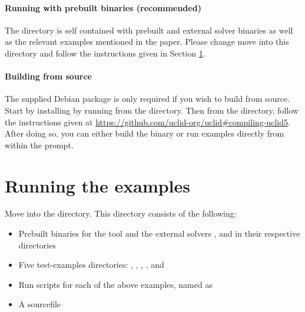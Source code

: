 \documentclass[runningheads]{llncs}
\begin{document}
\paragraph{Running with prebuilt binaries (recommended)}

The  directory is self contained with prebuilt \uclidcmd and external solver binaries as well as the relevant examples mentioned in the paper. Please change move into this directory and follow the instructions given in Section \ref{sec:running}.


\paragraph{Building from source} The supplied  Debian package is only required if you wish to build \uclidcmd from source. Start by installing  by running  from the  directory. Then from the  directory, follow the instructions given at \url{https://github.com/uclid-org/uclid#compiling-uclid5}. After doing so, you can either build the \uclidcmd binary or run examples directly from within the  prompt.


\section{Running the examples}
\label{sec:running}

Move into the  directory. This directory consists of the following:

\begin{itemize}
    \item Prebuilt binaries for the \uclidcmd tool and the external solvers ,  and  in their respective directories
    \item Five test-examples directories: , ,
    ,
    , and
    \item Run scripts for each of the above examples, named as 
    \item A  sourcefile
\end{itemize}
\end{document}
